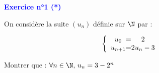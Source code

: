 \bigskip
\textbf{\textcolor{blue}{Exercice n°1 (*)}}

On considère la suite $(u_{n})$ définie sur $\N$ par :

\[
\left \{
\begin{array}{c @{=} c}
    u_{0} & 2 \\
    u_{n+1} & 2u_{n}-3 \\
\end{array}
\right.
\]

Montrer que : $\forall n \in \N\text{, }u_{n}=3-2^{n}$
